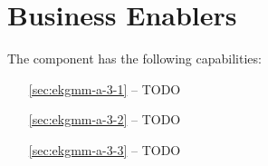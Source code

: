 \chapter{Business Enablers}\label{ch:ekgmm-a-3} %

The  component has the following capabilities:

\begin{itemize}[leftmargin=.5in]
  \item [\ref{sec:ekgmm-a-3-1}]  -- TODO
  \item [\ref{sec:ekgmm-a-3-2}]  -- TODO
  \item [\ref{sec:ekgmm-a-3-3}]  -- TODO
\end{itemize}




